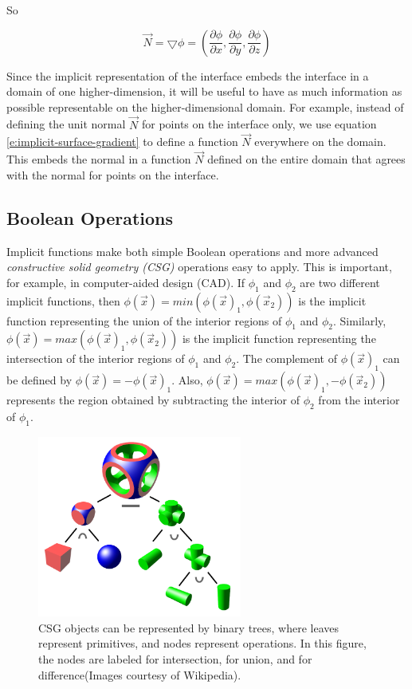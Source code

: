 So

\begin{equation*}
	\vec{N}=\bigtriangledown\phi=(\frac{\partial\phi}{\partial{x}},\frac{\partial\phi}{\partial{y}},\frac{\partial\phi}{\partial{z}})
\end{equation*}


Since the implicit representation of the interface embeds the interface in a domain of one higher-dimension, it will be useful to have as much information as possible representable on the higher-dimensional domain. For example, instead of defining the unit normal $\vec{N}$ for points on the interface only, we use equation \ref{e:implicit-surface-gradient} to define a function $\vec{N}$ everywhere on the domain. This embeds the normal in a function $\vec{N}$ defined on the entire domain that agrees with the normal for points on the interface.

\subsection{Boolean Operations}
Implicit functions make both simple Boolean operations and more advanced \textit{constructive solid geometry (CSG)} operations easy to apply. This is important, for example, in computer-aided design (CAD). If $\phi_1$ and $\phi_2$ are two different implicit functions, then $\phi(\vec{x})=min(\phi(\vec{x})_1,\phi(\vec{x}_2))$ is the implicit function representing the union of the interior regions of $\phi_1$ and $\phi_2$. Similarly, $\phi(\vec{x})=max(\phi(\vec{x})_1,\phi(\vec{x}_2))$ is the implicit function representing the intersection of the interior regions of $\phi_1$ and $\phi_2$. The complement of $\phi(\vec{x})_1$ can be defined by $\phi(\vec{x})=-\phi(\vec{x})_1$. Also, $\phi(\vec{x})=max(\phi(\vec{x})_1,-\phi(\vec{x}_2))$ represents the region obtained by subtracting the interior of $\phi_2$ from the interior of $\phi_1$.

\begin{figure}
	\begin{center}
		\includegraphics[width=0.6\textwidth]{graphics/df/Csg-tree}
	\end{center}
	\caption{CSG objects can be represented by binary trees, where leaves represent primitives, and nodes represent operations. In this figure, the nodes are labeled for intersection, for union, and for difference(Images courtesy of Wikipedia).}
\end{figure}

